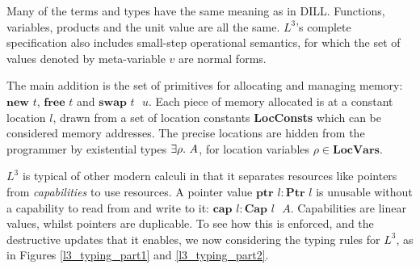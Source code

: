 \documentclass[]{unswthesis}
\newcommand{\Exists}[1]{\exists #1 \ldotp \,}
\newcommand{\Ptr}[1]{\textbf{Ptr $#1$}}
\newcommand{\ptr}[1]{\textbf{ptr $#1$}}
\newcommand{\Capa}[2]{\textbf{Cap $#1$ $#2$}}
\newcommand{\capa}[1]{\textbf{cap $#1$}}
\newcommand{\lnew}[1]{\textbf{new $#1$}}
\newcommand{\lfree}[1]{\textbf{free $#1$}}
\newcommand{\lswap}[2]{\textbf{swap $#1$ $#2$}}
\let\i\textit
\let\b\textbf
\begin{document}
Many of the terms and types have the same meaning as in DILL. Functions, variables, products and the unit value are all the same. $L^3$'s complete specification also includes small-step operational semantics, for which the set of values denoted by meta-variable $v$ are normal forms.

The main addition is the set of primitives for allocating and managing memory: $\lnew{t}$, $\lfree{t}$ and $\lswap{t}{u}$. Each piece of memory allocated is at a constant location $l$, drawn from a set of location constants \b{LocConsts} which can be considered memory addresses. The precise locations are hidden from the programmer by existential types $\Exists{\rho} A$, for location variables $\rho \in \b{LocVars}$.

$L^3$ is typical of other modern calculi in that it separates resources like pointers from \i{capabilities} to use resources. A pointer value $\ptr{l} : \Ptr{l}$ is unusable without a capability to read from and write to it: $\capa{l} : \Capa{l}{A}$. Capabilities are linear values, whilst pointers are duplicable. To see how this is enforced, and the destructive updates that it enables, we now considering the typing rules for $L^3$, as in Figures \ref{l3_typing_part1} and \ref{l3_typing_part2}.

\clearpage
\end{document}
